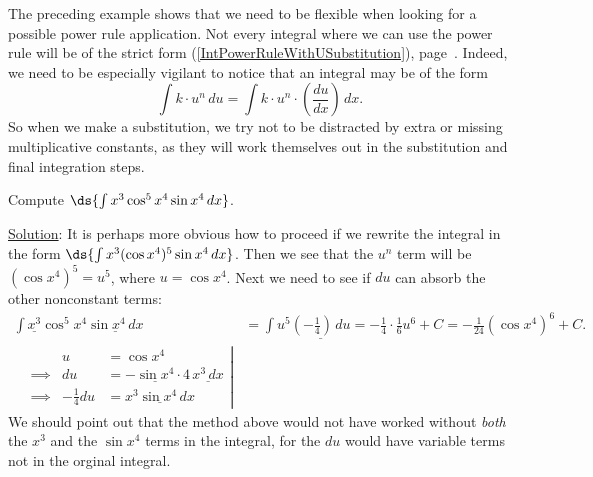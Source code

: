 The preceding example shows that we need to be flexible when looking
for a possible power rule application.  Not every integral where
we can use the power rule will be of the strict form
(\ref{IntPowerRuleWithUSubstitution}), 
page~\pageref{IntPowerRuleWithUSubstitution}.  Indeed, we need
to be especially vigilant to notice that an integral may be
of the form
\begin{equation}
\int k\cdot u^n\,du=\int k\cdot u^n\cdot\left(\frac{du}{dx}\right)\,dx.
\label{IntsWhichAreConstantsTimesChainRuleFormOfPowerRule}
\end{equation}
So when we make a substitution, we try not to be distracted by
extra or missing multiplicative 
constants, as they will work themselves out in
the substitution and final integration steps.




\bex Compute $\ds{\int x^3\cos^5x^4\sin x^4\,dx}$.

\underline{Solution}: It is perhaps more obvious how to proceed
if we rewrite the integral in the form
$\ds{\int x^3(\cos x^4)^5\sin x^4\,dx}$.  Then we see that
the $u^n$ term will be $(\cos x^4)^5=u^5$, where $u=\cos x^4$.
Next we need to see if $du$ can absorb the other nonconstant terms:
\begin{align*}
\int \underline{x^3}\cos^5x^4\underline{\sin x^4\,dx}
 &=\int u^5\underline{\left(-\frac14\right)\,du}
 =-\frac14\cdot\frac16u^6+C=-\frac1{24}(\cos x^4)^6+C.\\
\left.\begin{alignedat}{2}
&&u&=\cos x^4\\
&\implies&du&=-\underline{\sin x^4}\cdot 4\,\underline{x^3\,dx}\\
&\implies&-\frac14du&=\underline{x^3\sin x^4\,dx}\end{alignedat}\right|&
\end{align*}
\eex
We should point out that the method above would not have
worked without {\it both} the $x^3$ and the $\sin x^4$
terms in the integral, for the $du$ would have 
variable terms not in the orginal integral.

